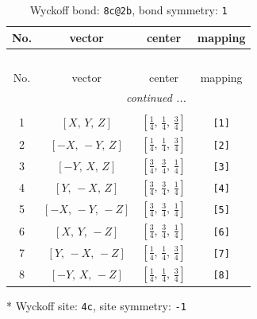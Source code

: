 \documentclass[fleqn,8pt]{jsarticle}
\begin{document}
\renewcommand{\arraystretch}{1.2}
\begin{longtable}{cccc}
\caption{Wyckoff bond: {\tt 8c@2b}, bond symmetry: {\tt 1}}
 \\
 \hline \hline
No. & vector & center & mapping \\ \hline \endfirsthead

\multicolumn{3}{l}{\tablename\ \thetable{}} \\
 \hline \hline
No. & vector & center & mapping \\ \hline \endhead

 \hline \hline
\multicolumn{3}{r}{\footnotesize\it continued ...} \\ \endfoot

 \hline \hline
\multicolumn{3}{r}{} \\ \endlastfoot

1 & $\left[ X,\, Y,\, Z \right]$ & $\left[ \frac{1}{4},\, \frac{1}{4},\, \frac{3}{4} \right]$ & {\tt [1]} \\ \hline
2 & $\left[ - X,\, - Y,\, Z \right]$ & $\left[ \frac{1}{4},\, \frac{1}{4},\, \frac{3}{4} \right]$ & {\tt [2]} \\ \hline
3 & $\left[ - Y,\, X,\, Z \right]$ & $\left[ \frac{3}{4},\, \frac{3}{4},\, \frac{1}{4} \right]$ & {\tt [3]} \\ \hline
4 & $\left[ Y,\, - X,\, Z \right]$ & $\left[ \frac{3}{4},\, \frac{3}{4},\, \frac{1}{4} \right]$ & {\tt [4]} \\ \hline
5 & $\left[ - X,\, - Y,\, - Z \right]$ & $\left[ \frac{3}{4},\, \frac{3}{4},\, \frac{1}{4} \right]$ & {\tt [5]} \\ \hline
6 & $\left[ X,\, Y,\, - Z \right]$ & $\left[ \frac{3}{4},\, \frac{3}{4},\, \frac{1}{4} \right]$ & {\tt [6]} \\ \hline
7 & $\left[ Y,\, - X,\, - Z \right]$ & $\left[ \frac{1}{4},\, \frac{1}{4},\, \frac{3}{4} \right]$ & {\tt [7]} \\ \hline
8 & $\left[ - Y,\, X,\, - Z \right]$ & $\left[ \frac{1}{4},\, \frac{1}{4},\, \frac{3}{4} \right]$ & {\tt [8]} \\
\end{longtable}
* Wyckoff site: {\tt 4c}, site symmetry: {\tt -1}
\renewcommand{\arraystretch}{1.2}
\end{document}
